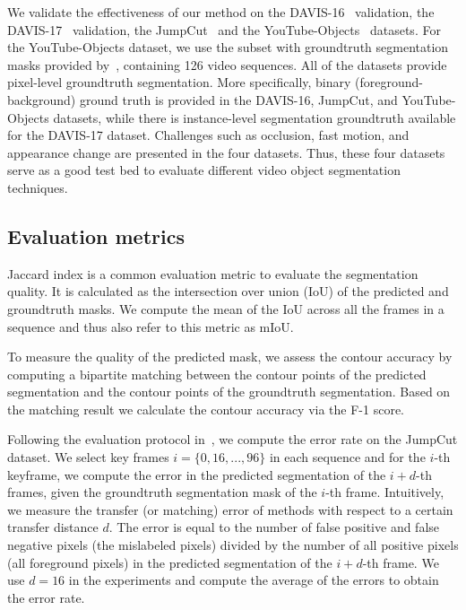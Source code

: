 We validate the effectiveness of our method on the DAVIS-16~\cite{PerazziCVPR16} validation, the DAVIS-17~\cite{pont2017DAVIS} validation, the JumpCut~\cite{FanTOG15} and the YouTube-Objects~\cite{PrestCVPR12} datasets. For the YouTube-Objects dataset, we use the subset with groundtruth segmentation masks provided by~\cite{JainECCV2014}, containing 126 video sequences. All of the datasets provide pixel-level groundtruth segmentation. More specifically, binary (foreground-background) ground truth is provided in the DAVIS-16, JumpCut, and YouTube-Objects datasets, while there is instance-level segmentation groundtruth available for the DAVIS-17 dataset. Challenges such as occlusion, fast motion, and appearance change are presented in the four datasets. Thus, these four datasets serve as a good test bed to evaluate different video object segmentation techniques.



\subsection{Evaluation metrics}

 Jaccard index is a common evaluation metric to evaluate the segmentation quality. It is calculated as the intersection over union (IoU) of the predicted and groundtruth masks. We compute the mean of the IoU across all the frames in a sequence and thus also refer to this metric as mIoU.

 To measure the quality of the predicted mask, we assess the contour accuracy by computing a bipartite matching between the contour points of the predicted segmentation and the contour points of the groundtruth segmentation. Based on the matching result we calculate the contour accuracy via the F-1 score. 


 Following the evaluation protocol in~\cite{FanTOG15}, we compute the error rate on the JumpCut dataset. We select key frames $i=\{0,16,...,96\}$ in each sequence and for the $i$-th keyframe, we compute the error in the predicted segmentation of the $i+d$-th frames, given the groundtruth segmentation mask of the $i$-th frame. Intuitively, we measure the transfer (or matching) error of methods with respect to a certain transfer distance $d$. The error is equal to the number of false positive and false negative pixels (the mislabeled pixels) divided by the number of all positive pixels (all foreground pixels) in the predicted segmentation of the $i+d$-th frame. We use $d=16$ in the experiments and compute the average of the errors to obtain the error rate.

